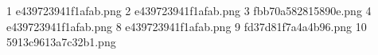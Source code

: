 1 e439723941f1afab.png
2 e439723941f1afab.png
3 fbb70a582815890e.png
4 e439723941f1afab.png
8 e439723941f1afab.png
9 fd37d81f7a4a4b96.png
10 5913c9613a7c32b1.png
